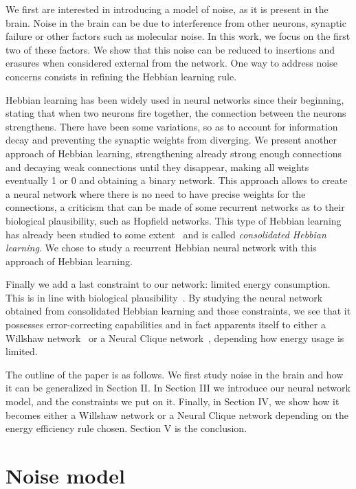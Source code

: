 \documentclass[journal]{IEEEtran}
\begin{document}
We first are interested in introducing a model of noise, as it is present in the brain. Noise in the brain can be due to interference from other neurons, synaptic failure or other factors such as molecular noise. In this work, we focus on the first two of these factors. We show that this noise can be reduced to insertions and erasures when considered external from the network. One way to address noise concerns consists in refining the Hebbian learning rule.

Hebbian learning has been widely used in neural networks since their beginning,
stating that when two neurons fire together, the connection between the neurons
strengthens. There have been some variations, so as to account for information
decay and preventing the synaptic weights from diverging. We present another
approach of Hebbian learning, strengthening already strong enough connections
and decaying weak connections until they disappear, making all weights
eventually 1 or 0 and obtaining a binary network. This approach allows to create a neural network where there is no need to have precise weights for the connections, a criticism that can be made of some recurrent networks as to their biological plausibility, such as Hopfield networks\cite{hopfield1982neural}. This type of Hebbian learning has already been studied to some extent~\cite{fusi2000spike,gerstner2002mathematical} and is called \emph{consolidated Hebbian learning}. We chose to study a recurrent Hebbian neural network with this approach of Hebbian learning.


Finally we add a last constraint to our network: limited energy consumption. This is in line with biological plausibility~\cite{attwell2001energy, lennie2003cost}. By studying the neural network obtained from consolidated Hebbian learning and those constraints, we see that it possesses error-correcting capabilities and in fact apparents itself to either a Willshaw network~\cite{willshaw1969non} or a Neural Clique network~\cite{gripon2011sparse}, depending how energy usage is limited.

 The outline of the paper is as follows. We first study noise in the brain and how it can be generalized in Section II. In Section III we introduce our neural network model, and the constraints we put on it. Finally, in Section IV, we show how it becomes either a Willshaw network or a Neural Clique network depending on the energy efficiency rule chosen. Section V is the conclusion.

\section{Noise model}
\end{document}
